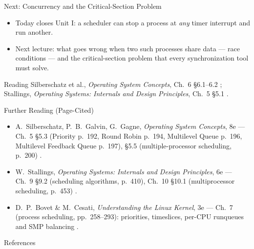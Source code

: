 \documentclass[aspectratio=169]{beamer}
\begin{document}
\begin{frame}{Next: Concurrency and the Critical-Section Problem}
  \begin{itemize}
    \item Today closes Unit I: a scheduler can stop a process at
      \emph{any} timer interrupt and run another.
    \item Next lecture: what goes wrong when two such processes share data
      --- race conditions --- and the critical-section problem that every
      synchronization tool must solve.
  \end{itemize}
  \vspace{0.3cm}
  \begin{block}{Reading}
    Silberschatz et al., \emph{Operating System Concepts}, Ch.~6
    \S6.1--6.2 \cite{SilberschatzOSC_operating_system_concepts}; Stallings,
    \emph{Operating Systems: Internals and Design Principles}, Ch.~5
    \S5.1 \cite{StallingsOS_internals_design_principles}.
  \end{block}
\end{frame}

\begin{frame}{Further Reading (Page-Cited)}
  \footnotesize
  \begin{itemize}
    \item A.~Silberschatz, P.~B.~Galvin, G.~Gagne, \emph{Operating System
      Concepts}, 8e --- Ch.~5 \S5.3 (Priority p.~192, Round Robin p.~194,
      Multilevel Queue p.~196, Multilevel Feedback Queue p.~197), \S5.5
      (multiple-processor scheduling, p.~200)
      \cite{SilberschatzOSC_operating_system_concepts}.
    \item W.~Stallings, \emph{Operating Systems: Internals and Design
      Principles}, 6e --- Ch.~9 \S9.2 (scheduling algorithms, p.~410),
      Ch.~10 \S10.1 (multiprocessor scheduling, p.~453)
      \cite{StallingsOS_internals_design_principles}.
    \item D.~P.~Bovet \& M.~Cesati, \emph{Understanding the Linux Kernel},
      3e --- Ch.~7 (process scheduling, pp.~258--293): priorities,
      timeslices, per-CPU runqueues and SMP balancing
      \cite{BovetCesati_understanding_linux_kernel}.
  \end{itemize}
  \vspace{0.2cm}
\end{frame}

\begin{frame}[allowframebreaks]{References}
  \footnotesize
  
  
\end{frame}
\end{document}
